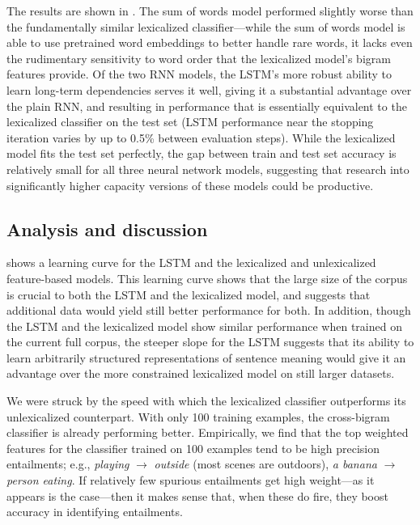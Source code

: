 The results are shown in . The sum of words model performed slightly worse than the fundamentally similar lexicalized classifier---while the sum of words model is able to use pretrained word embeddings to better handle rare words, it lacks even the rudimentary sensitivity to word order that the lexicalized model's bigram features provide. Of the two RNN models, the LSTM's more robust ability to learn long-term dependencies serves it well, giving it a substantial advantage over the plain RNN, and  resulting in performance that is essentially equivalent to the lexicalized classifier on the test set (LSTM performance near the stopping iteration varies by up to 0.5\% between evaluation steps). While the lexicalized model fits the test set perfectly, the gap between train and test set accuracy is relatively small for all three neural network models, suggesting that research into significantly higher capacity versions of these models could be productive.

\subsection{Analysis and discussion}

 shows a learning curve for the LSTM and the lexicalized and unlexicalized feature-based models. This learning curve shows that the large size of the corpus is crucial to both the LSTM and the lexicalized model, and suggests that additional data would yield still better performance for both. In addition, though the LSTM and the lexicalized model show similar performance when trained on the current full corpus, the steeper slope for the LSTM suggests that its ability to learn arbitrarily structured representations of sentence meaning would give it an advantage over the more constrained lexicalized model on still larger datasets.



We were struck by the speed with which the lexicalized classifier outperforms its unlexicalized counterpart.
With only 100 training examples, the cross-bigram classifier is already performing better.
Empirically, we find that the top weighted features for the classifier
  trained on 100 examples tend to be high precision entailments;
  e.g.,
  \textit{playing} $\rightarrow$ \textit{outside}
  (most scenes are outdoors), \textit{a banana} $\rightarrow$
  \textit{person eating}.
If relatively few spurious entailments get high weight---as it appears
is the case---then it makes sense that, when these do fire, they
boost accuracy in identifying entailments.
  
